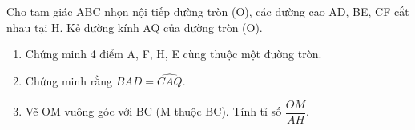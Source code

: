\begin{ex}
Cho tam giác ABC nhọn nội tiếp đường tròn (O), các đường cao AD, BE, CF cắt nhau tại H. Kẻ đường kính AQ của đường tròn (O).
	\begin{enumerate}
		\item[a)] Chứng minh 4 điểm A, F, H, E cùng thuộc một đường tròn.
		\item[b)] Chứng minh rằng $\widehat{BAD} = \widehat{CAQ}$.
		\item[c)] Vẽ OM vuông góc với BC (M thuộc BC). Tính tỉ số $\dfrac{OM}{AH}$.
	\end{enumerate}
\end{ex}
